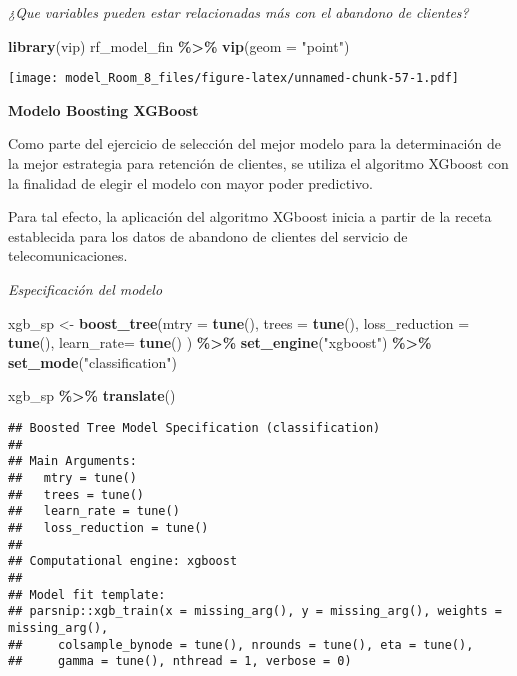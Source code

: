 \documentclass[
]{article}
\newenvironment{Shaded}{\begin{snugshade}}{\end{snugshade}}
\newcommand{\AttributeTok}[1]{\textcolor[rgb]{0.13,0.29,0.53}{#1}}
\newcommand{\FunctionTok}[1]{\textcolor[rgb]{0.13,0.29,0.53}{\textbf{#1}}}
\newcommand{\NormalTok}[1]{#1}
\newcommand{\OtherTok}[1]{\textcolor[rgb]{0.56,0.35,0.01}{#1}}
\newcommand{\SpecialCharTok}[1]{\textcolor[rgb]{0.81,0.36,0.00}{\textbf{#1}}}
\newcommand{\StringTok}[1]{\textcolor[rgb]{0.31,0.60,0.02}{#1}}
\begin{document}
\emph{¿Que variables pueden estar relacionadas más con el abandono de
clientes?}

\begin{Shaded}
\begin{Highlighting}[]
\FunctionTok{library}\NormalTok{(vip)}
\NormalTok{rf\_model\_fin }\SpecialCharTok{\%\textgreater{}\%}
  \FunctionTok{vip}\NormalTok{(}\AttributeTok{geom =} \StringTok{"point"}\NormalTok{)}
\end{Highlighting}
\end{Shaded}

\texttt{[image: model\_Room\_8\_files/figure-latex/unnamed-chunk-57-1.pdf]}

\textbf{Modelo Boosting XGBoost}

Como parte del ejercicio de selección del mejor modelo para la
determinación de la mejor estrategia para retención de clientes, se
utiliza el algoritmo XGboost con la finalidad de elegir el modelo con
mayor poder predictivo.

Para tal efecto, la aplicación del algoritmo XGboost inicia a partir de
la receta establecida para los datos de abandono de clientes del
servicio de telecomunicaciones.

\emph{Especificación del modelo}

\begin{Shaded}
\begin{Highlighting}[]
\NormalTok{xgb\_sp }\OtherTok{\textless{}{-}} \FunctionTok{boost\_tree}\NormalTok{(}\AttributeTok{mtry =} \FunctionTok{tune}\NormalTok{(), }\AttributeTok{trees =} \FunctionTok{tune}\NormalTok{(),}
  \AttributeTok{loss\_reduction =} \FunctionTok{tune}\NormalTok{(), }\AttributeTok{learn\_rate=} \FunctionTok{tune}\NormalTok{() ) }\SpecialCharTok{\%\textgreater{}\%}
  \FunctionTok{set\_engine}\NormalTok{(}\StringTok{"xgboost"}\NormalTok{) }\SpecialCharTok{\%\textgreater{}\%}
  \FunctionTok{set\_mode}\NormalTok{(}\StringTok{"classification"}\NormalTok{)}

\NormalTok{xgb\_sp }\SpecialCharTok{\%\textgreater{}\%}
  \FunctionTok{translate}\NormalTok{()}
\end{Highlighting}
\end{Shaded}

\begin{verbatim}
## Boosted Tree Model Specification (classification)
## 
## Main Arguments:
##   mtry = tune()
##   trees = tune()
##   learn_rate = tune()
##   loss_reduction = tune()
## 
## Computational engine: xgboost 
## 
## Model fit template:
## parsnip::xgb_train(x = missing_arg(), y = missing_arg(), weights = missing_arg(), 
##     colsample_bynode = tune(), nrounds = tune(), eta = tune(), 
##     gamma = tune(), nthread = 1, verbose = 0)
\end{verbatim}
\end{document}
